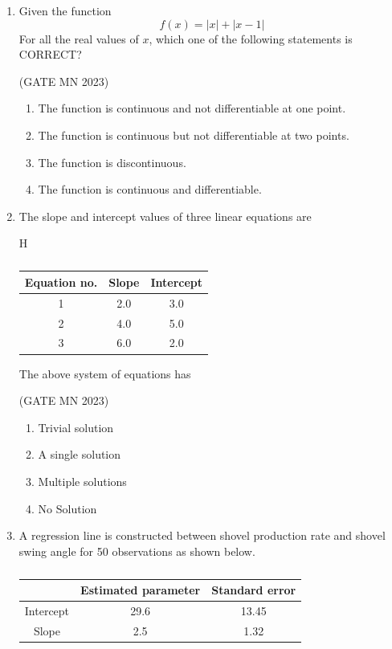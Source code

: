 \documentclass[journal]{IEEEtran}
\begin{document}
\begin{enumerate}
\item Given the function  
\[
f(x) = |x| + |x-1|
\]  
For all the real values of $x$, which one of the following statements is CORRECT?


\hfill(GATE MN 2023)
\begin{enumerate}[label=(\Alph*)]
    \item The function is continuous and not differentiable at one point.
    \item The function is continuous but not differentiable at two points.
    \item The function is discontinuous.
    \item The function is continuous and differentiable.
\end{enumerate}

\item The slope and intercept values of three linear equations are  

	\begin{table}{H}
		\normalsize
\begin{tabular}{|c|c|c|}
\hline
\textbf{Equation no.} & \textbf{Slope} & \textbf{Intercept} \\
\hline
1 & 2.0 & 3.0 \\\hline
2 & 4.0 & 5.0 \\\hline
3 & 6.0 & 2.0 \\
\hline
\end{tabular}
		\caption{}
		\label{tab:Q41}
		\end{table}

The above system of equations has  


\hfill(GATE MN 2023)
\begin{multicols}{2}
\begin{enumerate}
    \item Trivial solution
    \item A single solution
    \item Multiple solutions
    \item No Solution
\end{enumerate}
\end{multicols}

\item A regression line is constructed between shovel production rate and shovel swing angle for 50 observations as shown below.  
\begin{table}[H]                                    
\centering\normalsize

\begin{tabular}{|c|c|c|}
\hline
 & Estimated parameter & Standard error \\
\hline
Intercept & 29.6 & 13.45 \\
Slope     & 2.5  & 1.32 \\
\hline
\end{tabular}
\caption{}                  
\label{tab:Q41}                  
\end{table}


\end{enumerate}
\end{document}
